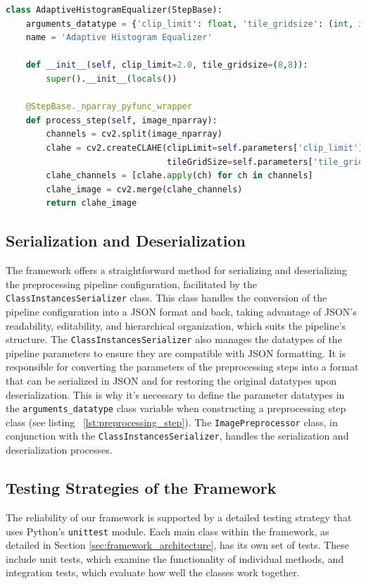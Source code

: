 \documentclass[journal]{new-aiaa}
\begin{document}
\begin{lstlisting}[language=Python, caption=Example of a Preprocessing Step Implementation, label=lst:preprocessing_step]
class AdaptiveHistogramEqualizer(StepBase):
    arguments_datatype = {'clip_limit': float, 'tile_gridsize': (int, int)}
    name = 'Adaptive Histogram Equalizer'

    def __init__(self, clip_limit=2.0, tile_gridsize=(8,8)):
        super().__init__(locals())

    @StepBase._nparray_pyfunc_wrapper
    def process_step(self, image_nparray):
        channels = cv2.split(image_nparray)
        clahe = cv2.createCLAHE(clipLimit=self.parameters['clip_limit'],
                                tileGridSize=self.parameters['tile_gridsize'])
        clahe_channels = [clahe.apply(ch) for ch in channels]
        clahe_image = cv2.merge(clahe_channels)
        return clahe_image
\end{lstlisting}

\subsection{Serialization and Deserialization}
The framework offers a straightforward method for serializing and deserializing the preprocessing pipeline configuration, facilitated by the \texttt{ClassInstancesSerializer} class. This class handles the conversion of the pipeline configuration into a JSON format and back, taking advantage of JSON's readability, editability, and hierarchical organization, which suits the pipeline's structure. The \texttt{ClassInstancesSerializer} also manages the datatypes of the pipeline parameters to ensure they are compatible with JSON formatting. It is responsible for converting the parameters of the preprocessing steps into a format that can be serialized in JSON and for restoring the original datatypes upon deserialization. This is why it's necessary to define the parameter datatypes in the \texttt{arguments\_datatype} class variable when constructing a preprocessing step class (see listing ~\ref{lst:preprocessing_step}). The \texttt{ImagePreprocessor} class, in conjunction with the \texttt{ClassInstancesSerializer}, handles the serialization and deserialization processes.


\subsection{Testing Strategies of the Framework}
The reliability of our framework is supported by a detailed testing strategy that uses Python's \texttt{unittest} module.\cite{unittestPython} Each main class within the framework, as detailed in Section \ref{sec:framework_architecture}, has its own set of tests. These include unit tests, which examine the functionality of individual methods, and integration tests, which evaluate how well the classes work together.
\end{document}
